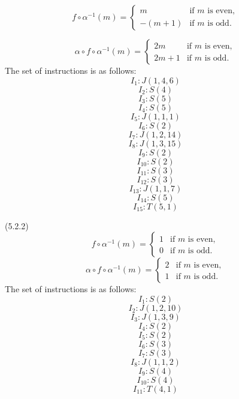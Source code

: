 \begin{exe}[5.2.1]
    \[
        f \circ \alpha^{-1} (m) = \begin{cases}
            m & \text{if } m \text{ is even}, \\
            -(m+1) & \text{if } m \text{ is odd}.
        \end{cases}
        \]

        \[
            \alpha \circ f \circ \alpha^{-1} (m) = \begin{cases}
                2m & \text{if } m \text{ is even}, \\
                2m + 1 & \text{if } m \text{ is odd}.
            \end{cases}
            \]
The set of instructions is as follows:
\[I_1: J(1, 4, 6)\]
\[I_2: S(4)\]
\[I_3: S(5)\]
\[I_4: S(5)\]
\[I_5: J(1, 1, 1)\]
\[I_6: S(2)\]
\[I_7: J(1, 2, 14)\]
\[I_8: J(1, 3, 15)\]
\[I_9: S(2)\]
\[I_{10}: S(2)\]
\[I_{11}: S(3)\]
\[I_{12}: S(3)\]
\[I_{13}: J(1, 1, 7)\]
\[I_{14}: S(5)\]
\[I_{15}: T(5, 1)\]
        
\end{exe}
\begin{exe}(5.2.2)
    \[
        f \circ \alpha^{-1} (m) = \begin{cases}
            1 & \text{if } m \text{ is even}, \\
            0 & \text{if } m \text{ is odd}.
        \end{cases}
        \]
    \[
            \alpha \circ f \circ \alpha^{-1} (m) = \begin{cases}
                2 & \text{if } m \text{ is even}, \\
                1 & \text{if } m \text{ is odd}.
            \end{cases}
    \]
The set of instructions is as follows:  
\[I_1: S(2)\]
\[I_2: J(1, 2, 10)\]
\[I_3: J(1, 3, 9)\]
\[I_4: S(2)\]
\[I_5: S(2)\]
\[I_6: S(3)\]
\[I_7: S(3)\]
\[I_8: J(1, 1, 2)\]
\[I_9 : S(4)\]
\[I_{10}: S(4)\] 
\[I_{11}: T(4, 1)\]
\end{exe}